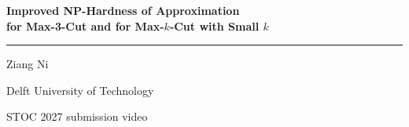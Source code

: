 
\providecommand{\pInum}[1]{\tikz[baseline=(n.base)]\node[circle,fill=acc,text=white,font=\bfseries\large,
  inner sep=0pt,minimum size=8.5mm] (n) {#1};}
\providecommand{\pIto}{\ensuremath{\;\longrightarrow\;}}

\begin{frame}[plain]
\vspace*{12mm}
{\color{acc}\bfseries\LARGE Improved NP-Hardness of Approximation\\[1.5mm]
 for Max-3-Cut and for Max-$k$-Cut with Small $k$\par}
\vspace{3mm}
{\color{acc!35}\rule{\linewidth}{0.8pt}}\par
\vspace{7mm}
{\Large Ziang Ni\par}
\vspace{2mm}
{\large Delft University of Technology\par}
\vspace{11mm}
{\color{soft}\small STOC 2027 submission video\par}
\end{frame}

